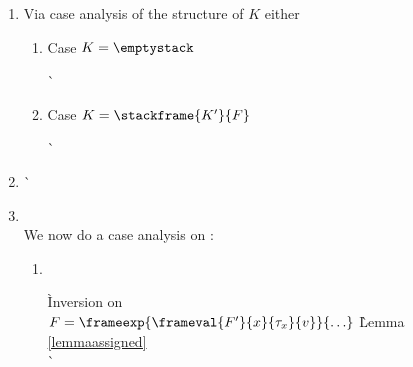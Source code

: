 \begin{enumerate}

\item {}

  Via case analysis of the structure of $K$ either
  \begin{enumerate}
  \item Case $K = \emptystack$
    \begin{tabbing}
      \`  \\
    \end{tabbing}

  \item Case $K = \stackframe{K'}{F}$
    \begin{tabbing}
      \`  \\
    \end{tabbing}

  \end{enumerate}

\item {}

  \begin{tabbing}
    \`  \\
  \end{tabbing}

\item {} \ \\
  We now do a case analysis on :

  \begin{enumerate}

  \item {} \ \\

    \begin{tabbing}
     \` Inversion on  \\
    $F = \frameexp{\frameval{F'}{x}{\tau_x}{v}}{\ldots}$ \` Lemma \ref{lemmaassigned} \\
      \`  \\
    \end{tabbing}


\end{enumerate}
\end{enumerate}
